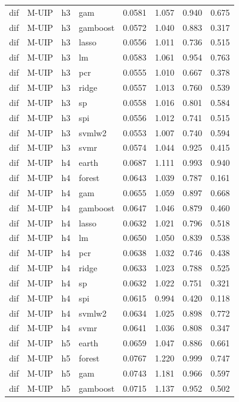 \begin{ThreePartTable}
\begin{longtable}[t]{llclcccc}
dif & M-UIP & h3 & gam & 0.0581 & 1.057 & 0.940 & 0.675\\
dif & M-UIP & h3 & gamboost & 0.0572 & 1.040 & 0.883 & 0.317\\
dif & M-UIP & h3 & lasso & 0.0556 & 1.011 & 0.736 & 0.515\\
dif & M-UIP & h3 & lm & 0.0583 & 1.061 & 0.954 & 0.763\\
dif & M-UIP & h3 & pcr & 0.0555 & 1.010 & 0.667 & 0.378\\
dif & M-UIP & h3 & ridge & 0.0557 & 1.013 & 0.760 & 0.539\\
dif & M-UIP & h3 & sp & 0.0558 & 1.016 & 0.801 & 0.584\\
dif & M-UIP & h3 & spi & 0.0556 & 1.012 & 0.741 & 0.515\\
dif & M-UIP & h3 & svmlw2 & 0.0553 & 1.007 & 0.740 & 0.594\\
dif & M-UIP & h3 & svmr & 0.0574 & 1.044 & 0.925 & 0.415\\
\addlinespace
dif & M-UIP & h4 & earth & 0.0687 & 1.111 & 0.993 & 0.940\\
dif & M-UIP & h4 & forest & 0.0643 & 1.039 & 0.787 & 0.161\\
dif & M-UIP & h4 & gam & 0.0655 & 1.059 & 0.897 & 0.668\\
dif & M-UIP & h4 & gamboost & 0.0647 & 1.046 & 0.879 & 0.460\\
dif & M-UIP & h4 & lasso & 0.0632 & 1.021 & 0.796 & 0.518\\
dif & M-UIP & h4 & lm & 0.0650 & 1.050 & 0.839 & 0.538\\
dif & M-UIP & h4 & pcr & 0.0638 & 1.032 & 0.746 & 0.438\\
dif & M-UIP & h4 & ridge & 0.0633 & 1.023 & 0.788 & 0.525\\
dif & M-UIP & h4 & sp & 0.0632 & 1.022 & 0.751 & 0.321\\
dif & M-UIP & h4 & spi & 0.0615 & 0.994 & 0.420 & 0.118\\
dif & M-UIP & h4 & svmlw2 & 0.0634 & 1.025 & 0.898 & 0.772\\
dif & M-UIP & h4 & svmr & 0.0641 & 1.036 & 0.808 & 0.347\\
\addlinespace
dif & M-UIP & h5 & earth & 0.0659 & 1.047 & 0.886 & 0.661\\
dif & M-UIP & h5 & forest & 0.0767 & 1.220 & 0.999 & 0.747\\
dif & M-UIP & h5 & gam & 0.0743 & 1.181 & 0.966 & 0.597\\
dif & M-UIP & h5 & gamboost & 0.0715 & 1.137 & 0.952 & 0.502\\

\end{longtable}
\end{ThreePartTable}
